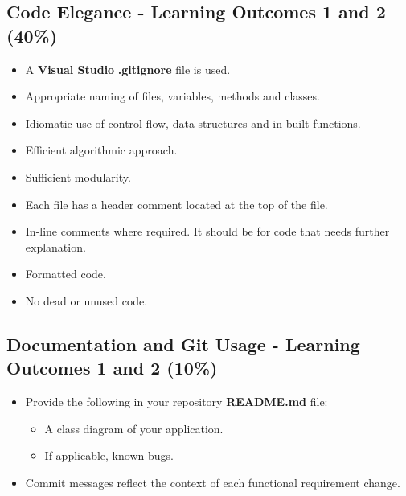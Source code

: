 \documentclass{article}
\begin{document}
\subsection*{Code Elegance - Learning Outcomes 1 and 2 (40\%)}
\begin{itemize}
    \item A \textbf{Visual Studio} \textbf{.gitignore} file is used. 
    \item Appropriate naming of files, variables, methods and classes.
    \item Idiomatic use of control flow, data structures and in-built functions.
    \item Efficient algorithmic approach.
    \item Sufficient modularity.
    \item Each file has a header comment located at the top of the file.
    \item In-line comments where required. It should be for code that needs further explanation.
    \item Formatted code.
    \item No dead or unused code.
\end{itemize}

\subsection*{Documentation and Git Usage - Learning Outcomes 1 and 2 (10\%)}
\begin{itemize}
    \item Provide the following in your repository \textbf{README.md} file:
    \begin{itemize}
        \item A class diagram of your application.
        \item If applicable, known bugs.
    \end{itemize}
    \item Commit messages reflect the context of each functional requirement change.
\end{itemize}
\end{document}
